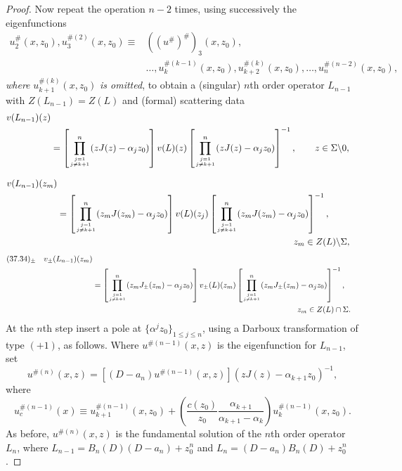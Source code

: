 \documentclass{surv-l}
\theoremstyle{plain}
\theoremstyle{definition}
\numberwithin{equation}{chapter}
\begin{document}
\begin{proof}
Now repeat the operation $n-2$ times, using successively the eigenfunctions
\begin{align*}
u_{2}^{\#}(x,z_{0}),u_{3}^{\#(2)}(x, z_{0}) \equiv&((u^{\#})^{\#})_{3}(x, z_{0}),\\
& \ldots,u_{k}^{\#(k-1)}(x,z_{0}),u_{k+2}^{\#(k)}(x, z_{0}),\ldots,u_{n}^{\#(n-2)}(x,z_{0}),
\end{align*}
\emph{where} $u_{k+1}^{\#(k)}(x,z_{0})$ \emph{is omitted}, to obtain a (singular) $n$th order operator $L_{n-1}$ with $Z(L_{n-1})=Z(L)$ and (formal) scattering data
\setcounter{equation}{31}
\begin{align}\label{eq37.32}
v(L_{n-1})(z)\\
& =\left[ \prod_{{j=1}\atop{j\neq k+1}}^{n} (zJ(z)- \alpha_{j}z_{0})\right]v(L)(z)\left[\prod_{{j=1}\atop{j\neq k+1}}^{n}(zJ(z)-\alpha_{j}z_{0})\right]^{-1}, \qquad z\in\Sigma\backslash 0,\nonumber
\end{align}

\begin{align}\label{eq37.33}
v(L_{n-1})(z_{m})\\
& = \left[\prod_{{j=1}\atop{j\neq k+1}}^{n}(z_{m}J(z_{m})-\alpha_{j}z_{0})\right]v(L)(z_{j})\left[\prod_{{j=1}\atop{j\neq k+1}}^{n}(z_{m}J(z_{m})-\alpha_{j}z_{0})\right]^{-1},\nonumber\\
& \qquad  \qquad  \qquad \qquad \qquad  \qquad  \qquad \qquad \qquad  \qquad  \qquad \qquad \qquad   z_{m}\in Z(L)\backslash \Sigma, \nonumber
\end{align}
\begin{align*}
(37.34)_{\pm}\quad v_{\pm}(L_{n-1})(z_{m})\\
& =\left[\prod_{{j=1}\atop{j\neq k+1}}^{n}(z_{m}J_{\pm}(z_{m})-\alpha_{j}z_{0})\right]v_{\pm}(L)(z_{m})\left[\prod_{{j=1}\atop{j\neq k+1}}^{n}(z_{m}J_{\pm}(z_{m})-\alpha_{j}z_{0})\right]^{-1},\nonumber \\
&  \qquad  \qquad  \qquad \qquad  \qquad  \qquad  \qquad \qquad \qquad  \qquad  \qquad \qquad \qquad   {z_{m}\in Z(L)\cap\Sigma}.\nonumber
\end{align*}
At the $n$th step insert a pole at $\{\alpha^{j}z_{0}\}_{1\leq j\leq n}$, using a Darboux transformation of type $(+1)$, as follows. Where $u^{\#(n-1)}(x, z)$ is the eigenfunction for $L_{n-1}$, set
\setcounter{equation}{34}
\begin{equation}\label{eq37.35}
u^{\#(n)}(x,z)=[(D-a_{n})u^{\#(n-1)}(x, z)](zJ(z) -\alpha_{k+1}z_{0})^{-1},
\end{equation}
where
\begin{equation}\label{eq37.36}
u_{c}^{\#(n-1)}(x)\equiv u_{k+1}^{\#(n-1)}(x, z_{0})+\left(\frac{c(z_{0})}{z_{0}}\frac{\alpha_{k+1}}{\alpha_{k+1}-\alpha_{k}}\right)u_{k}^{\#(n-1)}(x, z_{0}).
\end{equation}
As before, $u^{\#(n)}(x, z)$ is the fundamental solution of the $n$th order operator $L_{n}$, where $L_{n-1}=B_{n}(D)(D-a_{n})+z_{0}^{n}$ and $L_{n}=(D-a_{n})B_{n}(D)+z_{0}^{n}$.


\end{proof}
\end{document}
